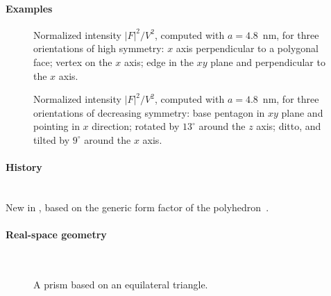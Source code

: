 \paragraph{Examples}\strut

\begin{figure}[H]
\begin{center}
\end{center}
\caption{Normalized intensity $|F|^2/V^2$,
computed with $a=4.8$~nm,
for three orientations of high symmetry:
$x$ axis perpendicular to a polygonal face;
vertex on the $x$ axis;
edge in the $xy$ plane and perpendicular to the $x$ axis.}
\end{figure}

\begin{figure}[H]
\begin{center}
\end{center}
\caption{Normalized intensity $|F|^2/V^2$,
computed with $a=4.8$~nm,
for three orientations of decreasing symmetry:
base pentagon in $xy$ plane and pointing in $x$ direction;
rotated by $13^\circ$ around the $z$ axis;
ditto, and tilted by $9^\circ$ around the $x$ axis.}
\end{figure}

\paragraph{History}\strut\\
New in ,
based on the generic form factor of the polyhedron~\cite{Wut17}.


 \label{SPrism3}

\paragraph{Real-space geometry}\strut\\

\begin{figure}[H]
\hfill
{}
\hfill
{}
\hfill
{}
\hfill
\caption{A prism based on an equilateral triangle.}
\end{figure}

